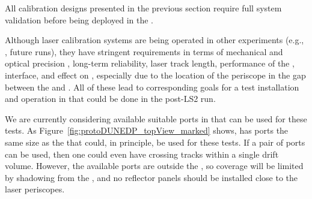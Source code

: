 
All calibration designs presented in the previous section require full system validation before being deployed in the  . 

Although laser calibration systems are being operated in other  experiments (e.g., , future  runs), they have stringent requirements in terms of mechanical and optical precision , long-term reliability, laser track length, performance of the ,  interface, and effect on \efield, especially due to the location of the periscope in the gap between the  and . All of these lead to corresponding goals for a test installation and operation in  that could be done in the post-LS2 run. 

We are currently considering available suitable ports in  that can be used for these tests.
As Figure~\ref{fig:protoDUNEDP_topView_marked} shows,  has ports the same size as the   that could, in principle, be used for these tests.  If a pair of ports can be used, then one could even have crossing tracks within a single drift volume. However, the available ports are outside the , so coverage will be limited by shadowing from the , and no reflector panels should be installed close to the laser periscopes.

